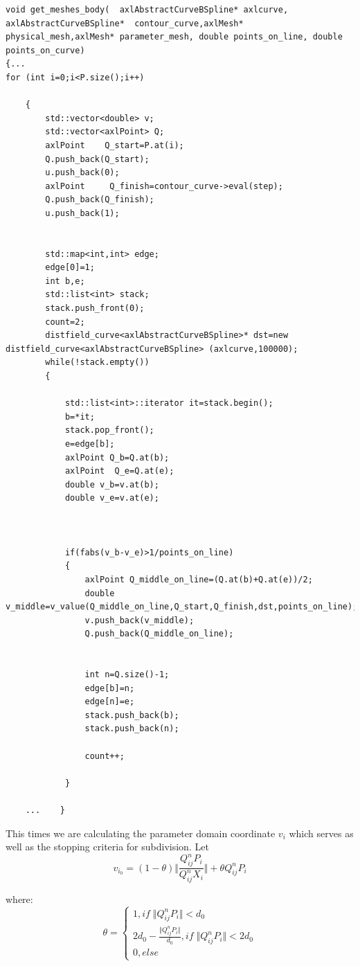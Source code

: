 \documentclass[12pt,a4paper]{article}
\begin{document}
\begin{lstlisting}[label=some-code,breaklines=true,caption=Subdivision Algorithm]
void get_meshes_body(  axlAbstractCurveBSpline* axlcurve, axlAbstractCurveBSpline*  contour_curve,axlMesh* physical_mesh,axlMesh* parameter_mesh, double points_on_line, double points_on_curve)
{...
for (int i=0;i<P.size();i++)

    {
        std::vector<double> v;
        std::vector<axlPoint> Q;
        axlPoint    Q_start=P.at(i);
        Q.push_back(Q_start);
        u.push_back(0);
        axlPoint     Q_finish=contour_curve->eval(step);
        Q.push_back(Q_finish);
        u.push_back(1);
      

        std::map<int,int> edge;
        edge[0]=1;
        int b,e;
        std::list<int> stack;
        stack.push_front(0);
        count=2;
        distfield_curve<axlAbstractCurveBSpline>* dst=new  distfield_curve<axlAbstractCurveBSpline> (axlcurve,100000);
        while(!stack.empty())
        {

            std::list<int>::iterator it=stack.begin();
            b=*it;
            stack.pop_front();
            e=edge[b];
            axlPoint Q_b=Q.at(b);
            axlPoint  Q_e=Q.at(e);
            double v_b=v.at(b);
            double v_e=v.at(e);



            if(fabs(v_b-v_e)>1/points_on_line)
            {
                axlPoint Q_middle_on_line=(Q.at(b)+Q.at(e))/2;
                double v_middle=v_value(Q_middle_on_line,Q_start,Q_finish,dst,points_on_line);
                v.push_back(v_middle);
                Q.push_back(Q_middle_on_line);


                int n=Q.size()-1;
                edge[b]=n;
                edge[n]=e;
                stack.push_back(b);
                stack.push_back(n);

                count++;

            }
          
    ...    }
\end{lstlisting}


This times we are calculating the parameter domain coordinate $v_{i}$ which serves as well as the stopping criteria for subdivision.
Let $$v_{i_{0}}=(1-\theta)\Vert \frac{Q_{ij}^{n}P_{i}}{Q_{ij}^{n}X_{i}} \Vert + \theta Q_{ij}^{n}P_{i}$$

where: \\
$$\theta=\begin{cases}1, if \;\Vert Q_{ij}^{n} P_{i}\Vert<d_{0} \\
 2d_{0} - \frac{ \Vert Q_{ij}^{n} P_{i} \Vert}{ d_{0} }, if \; \Vert Q_{ij}^{n} P_{i}\Vert <2d_{0}\\
 0 , else \end{cases}$$
 
\end{document}
